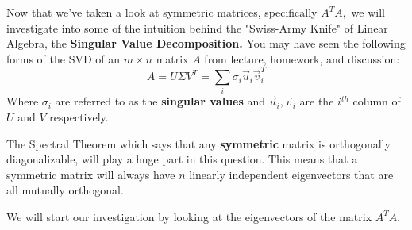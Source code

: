 


Now that we've taken a look at symmetric matrices, specifically $A^{T} A,$ we will investigate into some of the intuition behind the "Swiss-Army Knife" of Linear Algebra, the \textbf{Singular Value Decomposition.} You may have seen the following forms of the SVD of an $m \times n$ matrix $A$ from lecture, homework, and discussion:
\begin{equation}
  A = U \Sigma V^{T} = \sum\limits_{i} \sigma_{i} \vec{u}_{i} \vec{v}_{i}^T
\end{equation}
Where $\sigma_{i}$ are referred to as the \textbf{singular values} and $\vec{u}_{i}, \vec{v}_{i}$ are the $i^{th}$ column of $U$ and $V$ respectively.

The Spectral Theorem which says that any \textbf{symmetric} matrix is orthogonally diagonalizable, will play a huge part in this question. 
This means that a symmetric matrix will always have $n$ linearly independent eigenvectors that are all mutually orthogonal.

We will start our investigation by looking at the eigenvectors of the matrix $A^{T} A.$

